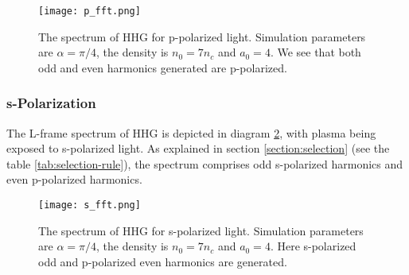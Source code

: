 \begin{figure}[H]
    \centering
    \texttt{[image: p\_fft.png]}
    \caption{The spectrum of HHG for p-polarized light. Simulation parameters are $\alpha = \pi/4$, the density is $n_0 = 7n_c$ and $a_0 = 4$. We see that both odd and even harmonics generated are p-polarized.}
    \label{fig:p-fft}
\end{figure}


\subsubsection{s-Polarization}
The L-frame spectrum of HHG is depicted in diagram \ref{fig:s-fft}, with plasma being exposed to s-polarized light. As explained in section \ref{section:selection} (see the table \ref{tab:selection-rule}), the spectrum comprises odd s-polarized harmonics and even p-polarized harmonics.
\begin{figure}[h]
    \centering
    \texttt{[image: s\_fft.png]}
    \caption{The spectrum of HHG for s-polarized light. Simulation parameters are $\alpha = \pi/4$, the density is $n_0 = 7n_c$ and $a_0 = 4$. Here s-polarized odd and p-polarized even harmonics are generated.}
    \label{fig:s-fft}
\end{figure}
